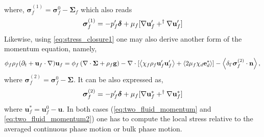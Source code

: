 where, $\bm\sigma_f^{(1)}=\bm\sigma_f^0 - \bm\Sigma_f$ which also reads %
\begin{equation}
\bm\sigma_f^{(1)} = -p_f'\bm\delta
+ \mu_f [
    \grad \textbf{u}_f'
    + ^\dagger \grad \textbf{u}_f']
    \label{eq:disturbance_stress1}
\end{equation} 
Likewise, using \ref{eq:stress_closure1} one may also derive another form of the momentum equation, namely,
\begin{equation}
    \phi_f \rho_f(\pddt + \textbf{u}_f  \cdot \grad) \textbf{u}_f
    = \phi_f 
    \left(\div \bm{\Sigma}
    + \rho_f \textbf{g}\right)
    - \div 
    [\avg{\chi_f\rho_f \textbf{u}_f'\textbf{u}_f'} + \avg{2\mu_f \chi_d \textbf{e}_d^*}]
    - \avg{\delta_\Gamma \bm\sigma_f^{(2)}\cdot \textbf{n}},
    \label{eq:two_fluid_momentum2}
\end{equation} 
where $\bm\sigma_f^{(2)}=\bm\sigma_f^0 - \bm\Sigma$. 
It can be also expressed as, 
\begin{equation}
    \bm\sigma_f^{(2)} 
    =
    -p_f'\bm\delta
    + \mu_f [
        \grad \textbf{u}_f^*
        + ^\dagger \grad \textbf{u}_f^*
    ]
    \label{eq:disturbance_stress2}
\end{equation}
where $\textbf{u}_f^*= \textbf{u}_f^0 - \textbf{u}$.
In both cases (\ref{eq:two_fluid_momentum} and \ref{eq:two_fluid_momentum2}) one has to compute the local stress relative to the averaged continuous phase motion or bulk phase motion. 
